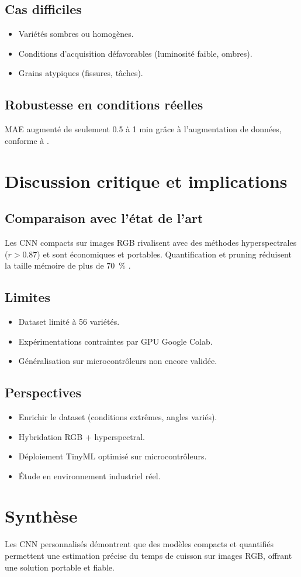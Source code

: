 \subsection{Cas difficiles}
\begin{itemize}
    \item Variétés sombres ou homogènes.  
    \item Conditions d’acquisition défavorables (luminosité faible, ombres).  
    \item Grains atypiques (fissures, tâches).  
\end{itemize}

\subsection{Robustesse en conditions réelles}
MAE augmenté de seulement 0.5 à 1 min grâce à l’augmentation de données, conforme à \citet{tastan2023}.

\section{Discussion critique et implications}
\subsection{Comparaison avec l’état de l’art}
Les CNN compacts sur images RGB rivalisent avec des méthodes hyperspectrales ($r>0.87$) \citep{mendoza2018} et sont économiques et portables. Quantification et pruning réduisent la taille mémoire de plus de 70~\% \citep{jacob2018quantization, han2016deep}.

\subsection{Limites}
\begin{itemize}
    \item Dataset limité à 56 variétés.  
    \item Expérimentations contraintes par GPU Google Colab.  
    \item Généralisation sur microcontrôleurs non encore validée.
\end{itemize}

\subsection{Perspectives}
\begin{itemize}
    \item Enrichir le dataset (conditions extrêmes, angles variés).  
    \item Hybridation RGB + hyperspectral.  
    \item Déploiement TinyML optimisé sur microcontrôleurs.  
    \item Étude en environnement industriel réel.
\end{itemize}

\section{Synthèse}
Les CNN personnalisés démontrent que des modèles compacts et quantifiés permettent une estimation précise du temps de cuisson sur images RGB, offrant une solution portable et fiable.